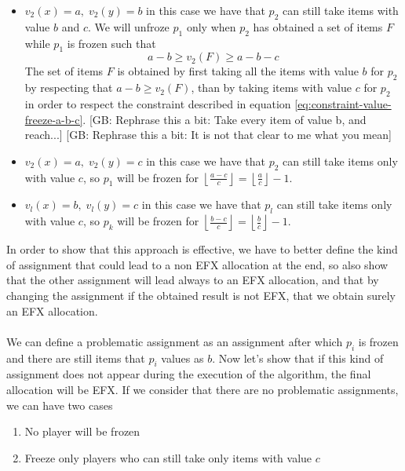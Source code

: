 \documentclass{article}
\newcommand{\gb}[1]{{\color{red}[GB: #1]}}
\begin{document}
\begin{itemize}
    \item $v_2(x) = a,\; v_2(y) =  b$ in this case we have that $p_2$ can still take items with value $b$ and $c$. We will unfroze $p_1$ only when $p_2$ has obtained a set of items $F$ while $p_1$ is frozen such that
    \begin{equation}
        a-b\ge v_2(F)\ge a-b-c
        \label{eq:constraint-value-freeze-a-b-c}
    \end{equation}
    The set of items $F$ is obtained by first taking all the items with value $b$ for $p_2$ by respecting that $a-b\ge v_2(F)$, than by taking items with value $c$ for $p_2$ in order to respect the constraint described in equation \ref{eq:constraint-value-freeze-a-b-c}.
    \gb{Rephrase this a bit: Take every item of value b, and reach...}
    \gb{Rephrase this a bit: It is not that clear to me what you mean}
    \item $v_2(x) = a,\; v_2(y) =  c$ in this case we have that $p_2$ can still take items only with value $c$, so $p_1$ will be frozen for $\left\lfloor \frac{a-c}{c}\right \rfloor =\left \lfloor \frac{a}{c}\right \rfloor - 1$.
    \item $v_l(x) = b,\; v_l(y) =  c$ in this case we have that $p_l$ can still take items only with value $c$, so $p_k$ will be frozen for $\left \lfloor \frac{b-c}{c}\right \rfloor =\left  \lfloor \frac{b}{c}\right \rfloor - 1$.
\end{itemize}
In order to show that this approach is effective, we have to better define the kind of assignment that could lead to a non EFX allocation at the end, so also show that the other assignment will lead always to an EFX allocation, and that by changing the assignment if the obtained result is not EFX, that we obtain surely an EFX allocation.
\paragraph{}
We can define a problematic assignment as an assignment after which $p_i$ is frozen and there are still items that $p_i$ values as $b$. Now let's show that if this kind of assignment does not appear during the execution of the algorithm, the final allocation will be EFX. If we consider that there are no problematic assignments, we can have two cases
\begin{enumerate}
    \item No player will be frozen
    \item Freeze only players who can still take only items with value $c$ 
\end{enumerate}
\end{document}
